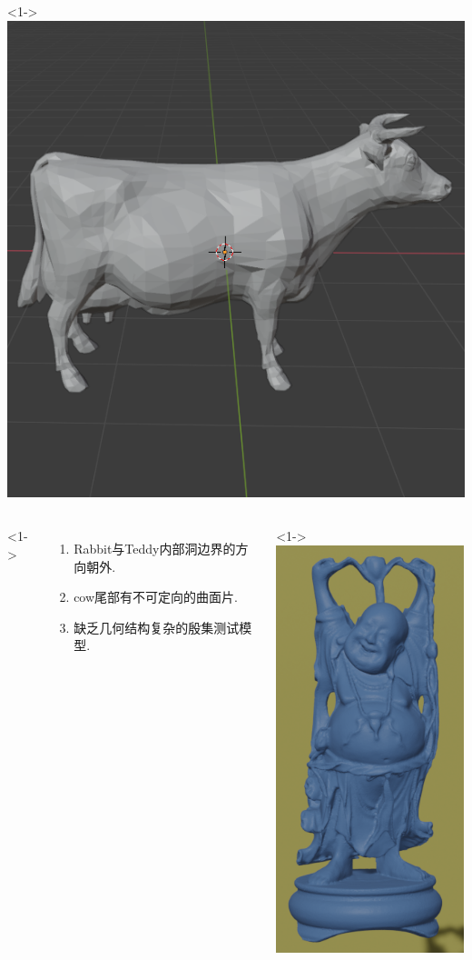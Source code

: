 \documentclass[UTF8]{ctexbeamer}	%
\theoremstyle{plain}
\theoremstyle{definition}
\theoremstyle{remark}
\numberwithin{equation}{section}
\begin{document}
\begin{frame}
\begin{columns}
        <1->
        \includegraphics[width = \textwidth]{fig/wrong3.png}
    \end{columns}
    \begin{columns}
        <1->
    \begin{enumerate}
        \item Rabbit与Teddy内部洞边界的方向朝外.
        \item cow尾部有不可定向的曲面片.
        \item 缺乏几何结构复杂的殷集测试模型.
    \end{enumerate}
    <1->
        \includegraphics[width = 0.4
        \textwidth]{fig/wrong4.png}
    \end{columns}

\end{frame}
\end{document}
